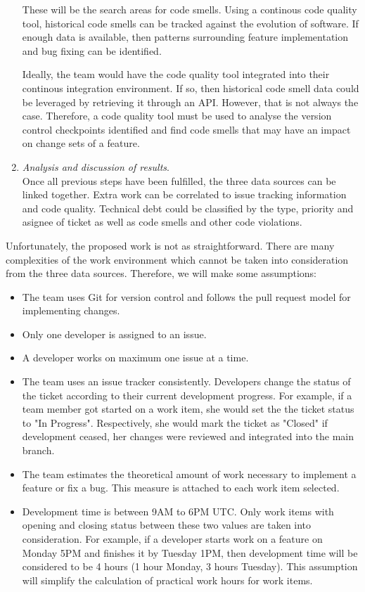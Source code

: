 \documentclass{mprop}
\begin{document}
\begin{enumerate}
	      These will be the search areas for code smells. Using a continous code
	      quality tool, historical code smells can be tracked against the evolution of
	      software. If enough data is available, then patterns surrounding feature
	      implementation and bug fixing can be identified.

	      Ideally, the team would have the code quality tool integrated into
	      their continous integration environment. If so, then historical code
	      smell data could be leveraged by retrieving it through an API.
	      However, that is not always the case. Therefore, a code quality tool
	      must be used to analyse the version control checkpoints identified and
	      find code smells that may have an impact on change sets of a feature.

	\item \textit{Analysis and discussion of results}.\\
	      Once all previous steps have been fulfilled, the three data sources
	      can be linked together. Extra work can be correlated to issue tracking
	      information and code quality. Technical debt could be classified by
	      the type, priority and asignee of ticket as well as code smells and
	      other code violations.
\end{enumerate}

Unfortunately, the proposed work is not as straightforward. There are many
complexities of the work environment which cannot be taken into consideration
from the three data sources. Therefore, we will make some assumptions:
\begin{itemize}
	\item The team uses Git for version control and follows the pull request model
	      for implementing changes.
	\item Only one developer is assigned to an issue.
	\item A developer works on maximum one issue at a time.
	\item The team uses an issue tracker consistently. Developers change the
	      status of the ticket according to their current development progress. For
	      example, if a team member got started on a work item, she would set the the
	      ticket status to "In Progress". Respectively, she would mark the ticket as
	      "Closed" if development ceased, her changes were reviewed and integrated
	      into the main branch.
	\item The team estimates the theoretical amount of work necessary to
	      implement a feature or fix a bug. This measure is attached to each
	      work item selected.
	\item Development time is between 9AM to 6PM UTC. Only work items with
	      opening and closing status between these two values are taken into
	      consideration. For example, if a developer starts work on a feature on
	      Monday 5PM and finishes it by Tuesday 1PM, then development time will be
	      considered to be 4 hours (1 hour Monday, 3 hours Tuesday). This assumption
	      will simplify the calculation of practical work hours for work items.
\end{itemize}
\end{document}
